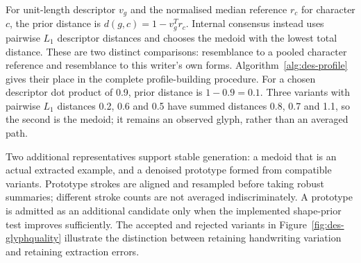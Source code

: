For unit-length descriptor $v_g$ and the normalised median reference $r_c$ for character $c$, the prior distance is $d(g,c)=1-v_g^Tr_c$. Internal consensus instead uses pairwise $L_1$ descriptor distances and chooses the medoid with the lowest total distance. These are two distinct comparisons: resemblance to a pooled character reference and resemblance to this writer's own forms. Algorithm~\ref{alg:des-profile} gives their place in the complete profile-building procedure. For a chosen descriptor dot product of 0.9, prior distance is $1-0.9=0.1$. Three variants with pairwise $L_1$ distances 0.2, 0.6 and 0.5 have summed distances 0.8, 0.7 and 1.1, so the second is the medoid; it remains an observed glyph, rather than an averaged path.


\begin{designalgorithm}
\caption{Labelled handwriting to a persistent writer profile}
\label{alg:des-profile}
\begin{designpseudo}
\end{designpseudo}
\end{designalgorithm}

Two additional representatives support stable generation: a medoid that is an actual extracted example, and a denoised prototype formed from compatible variants. Prototype strokes are aligned and resampled before taking robust summaries; different stroke counts are not averaged indiscriminately. A prototype is admitted as an additional candidate only when the implemented shape-prior test improves sufficiently. The accepted and rejected variants in Figure~\ref{fig:des-glyphquality} illustrate the distinction between retaining handwriting variation and retaining extraction errors.


